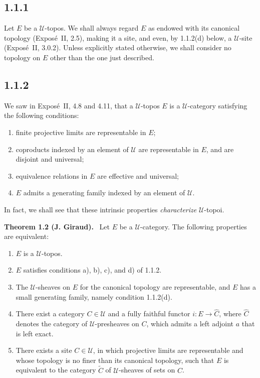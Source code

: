 \documentclass[11pt]{article}
\newcommand{\U}{\mathcal{U}}
\newenvironment{statement}[1]{\par\medskip\noindent\textbf{#1.}\ }{\par\medskip}
\begin{document}
\subsection*{1.1.1}
Let \(E\) be a \(\U\)-topos. We shall always regard \(E\) as endowed with its canonical topology (Expos\'e~II, 2.5), making it a site, and even, by 1.1.2(d) below, a \(\U\)-site (Expos\'e~II, 3.0.2). Unless explicitly stated otherwise, we shall consider no topology on \(E\) other than the one just described.

\subsection*{1.1.2}
We saw in Expos\'e~II, 4.8 and 4.11, that a \(\U\)-topos \(E\) is a \(\U\)-category satisfying the following conditions:
\begin{enumerate}[label=\alph*)]
\item finite projective limits are representable in \(E\);
\item coproducts indexed by an element of \(\U\) are representable in \(E\), and are disjoint and universal;
\item equivalence relations in \(E\) are effective and universal;
\item \(E\) admits a generating family indexed by an element of \(\U\).
\end{enumerate}
In fact, we shall see that these intrinsic properties \emph{characterize} \(\U\)-topoi.

\begin{statement}{Theorem 1.2 (J. Giraud)}
Let \(E\) be a \(\U\)-category. The following properties are equivalent:
\begin{enumerate}[label=\roman*)]
\item \(E\) is a \(\U\)-topos.
\item \(E\) satisfies conditions a), b), c), and d) of 1.1.2.
\item The \(\U\)-sheaves on \(E\) for the canonical topology are representable, and \(E\) has a small generating family, namely condition 1.1.2(d).
\item There exist a category \(C\in\U\) and a fully faithful functor \(i:E\to\widehat C\), where \(\widehat C\) denotes the category of \(\U\)-presheaves on \(C\), which admits a left adjoint \(a\) that is left exact.
\item[\({\rm i'}\)] There exists a site \(C\in\U\), in which projective limits are representable and whose topology is no finer than its canonical topology, such that \(E\) is equivalent to the category \(\widetilde C\) of \(\U\)-sheaves of sets on \(C\).
\end{enumerate}
\end{statement}
\end{document}
